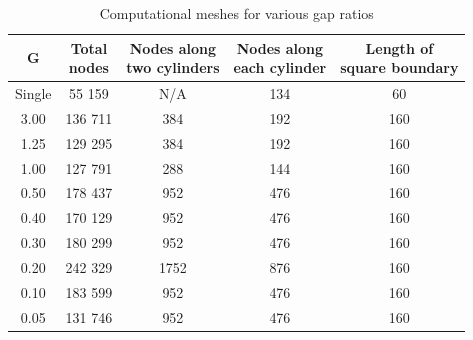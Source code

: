 \begin{table} [tb]
	\centering
	\caption{Computational meshes for various gap ratios}
	\label{tablemeshes}
	{\renewcommand{\arraystretch}{1.2}
		\begin{tabular}{|c|c|c|c|c|} \hline 
			G & \Centerstack{Total\\nodes} &\Centerstack{Nodes along\\two cylinders} & \Centerstack{Nodes along\\each cylinder} & \Centerstack{Length of\\square boundary}\\ \hline 
			Single  & 55 159 & N/A & 134 & 60 \\ \hline 
			3.00 & 136 711 & 384 & 192 & 160 \\ \hline 
			1.25 & 129 295 & 384 & 192 & 160 \\ \hline 
			1.00 & 127 791 & 288 & 144 & 160 \\ \hline 
			0.50 & 178 437 & 952 & 476 & 160 \\ \hline 
			0.40 & 170 129 & 952 & 476 & 160 \\ \hline 
			0.30 & 180 299 & 952 & 476 & 160 \\ \hline 
			0.20 & 242 329 & 1752 & 876 & 160 \\ \hline 
			0.10 & 183 599 & 952 & 476 & 160 \\ \hline 
			0.05 & 131 746 & 952 & 476 & 160 \\ \hline 
		\end{tabular}
	}
\end{table}


